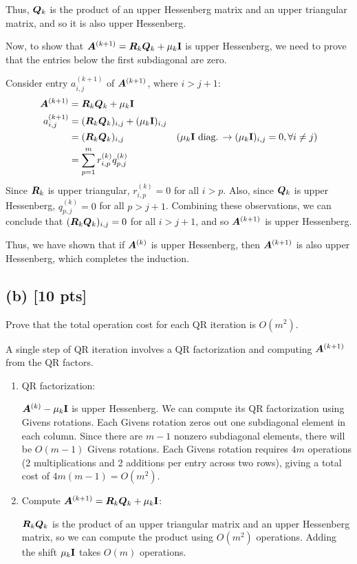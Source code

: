 \documentclass[twoside,10pt]{article}
\begin{document}
    Thus, $\bm{Q}_k$ is the product of an upper Hessenberg matrix and an upper triangular matrix, and so it is also upper Hessenberg.
 
    Now, to show that $\bm{A}^{(k+1)} = \bm{R}_k \bm{Q}_k + \mu_k \mathbf{I}$ is upper Hessenberg, we need to prove that the entries below the first subdiagonal are zero.
    
    Consider entry $a_{i,j}^{(k+1)}$ of $\bm{A}^{(k+1)}$, where $i > j + 1$:
    \begin{align*}
      \bm{A}^{(k+1)} &= \bm{R}_k \bm{Q}_k + \mu_k \mathbf{I} \\
      a_{i,j}^{(k+1)} &= (\bm{R}_k \bm{Q}_k)_{i,j} + (\mu_k \mathbf{I})_{i,j}\\
      &= (\bm{R}_k \bm{Q}_k)_{i,j}&\text{($\mu_k \mathbf{I}$ diag. $\rightarrow (\mu_k \mathbf{I})_{i,j} = 0, \forall i \neq j$)}\\
      &= \sum_{p=1}^m r_{i,p}^{(k)} q_{p,j}^{(k)}
    \end{align*}
    Since $\bm{R}_k$ is upper triangular, $r_{i,p}^{(k)} = 0$ for all $i > p$.
    Also, since $\bm{Q}_k$ is upper Hessenberg, $q_{p,j}^{(k)} = 0$ for all $p > j + 1$.
    Combining these observations, we can conclude that $(\bm{R}_k \bm{Q}_k)_{i,j} = 0$ for all $i > j + 1$, and so $\bm{A}^{(k+1)}$ is upper Hessenberg.

    Thus, we have shown that if $\bm{A}^{(k)}$ is upper Hessenberg, then $\bm{A}^{(k+1)}$ is also upper Hessenberg, which completes the induction.
 
  \subsection*{(b) [10 pts]}
  Prove that the total operation cost for each QR iteration is $O(m^2)$.

  \quad A single step of QR iteration involves a QR factorization and computing $\bm{A}^{(k+1)}$ from the QR factors.

  \begin{enumerate}
    \item QR factorization:
    
    $\bm{A}^{(k)} - \mu_k \mathbf{I}$ is upper Hessenberg.
    We can compute its QR factorization using Givens rotations.
    Each Givens rotation zeros out one subdiagonal element in each column.
    Since there are $m-1$ nonzero subdiagonal elements, there will be $O(m-1)$ Givens rotations.
    Each Givens rotation requires $4m$ operations (2 multiplications and 2 additions per entry across two rows),
    giving a total cost of $4m(m-1) = O(m^2)$.
    \item Compute $\bm{A}^{(k+1)} = \bm{R}_k \bm{Q}_k + \mu_k \mathbf{I}$:
    
    $\bm{R}_k \bm{Q}_k$ is the product of an upper triangular matrix and an upper Hessenberg matrix, so we can compute the product using $O(m^2)$ operations.
    Adding the shift $\mu_k \mathbf{I}$ takes $O(m)$ operations.
  \end{enumerate}
\end{document}
